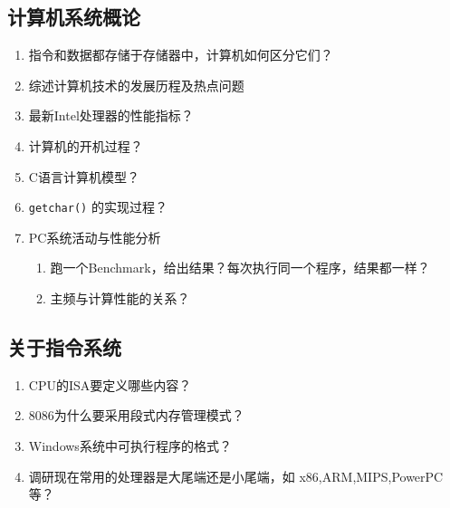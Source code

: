 \documentclass[]{report}
\begin{document}
	\subsection{计算机系统概论}
		\begin{enumerate}
			\item 指令和数据都存储于存储器中，计算机如何区分它们？
			\item 综述计算机技术的发展历程及热点问题
			\item 最新Intel处理器的性能指标？
			\item 计算机的开机过程？
			\item C语言计算机模型？
			\item \verb|getchar()| 的实现过程？
			\item PC系统活动与性能分析
			\begin{enumerate}
				\item 跑一个Benchmark，给出结果？每次执行同一个程序，结果都一样？
				\item 主频与计算性能的关系？
			\end{enumerate}
		\end{enumerate}
	\subsection{关于指令系统}
		\begin{enumerate}
			\item CPU的ISA要定义哪些内容？
			\item 8086为什么要采用段式内存管理模式？
			\item Windows系统中可执行程序的格式？
			\item 调研现在常用的处理器是大尾端还是小尾端，如 x86,ARM,MIPS,PowerPC等？
		\end{enumerate}
\end{document}

